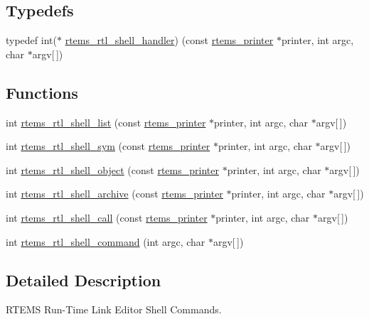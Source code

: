 \subsection*{Typedefs}
\begin{DoxyCompactItemize}
\item 
typedef int($\ast$ \mbox{\hyperlink{rtl-shell_8c_abdb8a1e1d10a86732342e0157986f7ff}{rtems\+\_\+rtl\+\_\+shell\+\_\+handler}}) (const \mbox{\hyperlink{structrtems__printer}{rtems\+\_\+printer}} $\ast$printer, int argc, char $\ast$argv\mbox{[}$\,$\mbox{]})
\end{DoxyCompactItemize}
\subsection*{Functions}
\begin{DoxyCompactItemize}
\item 
int \mbox{\hyperlink{rtl-shell_8c_a1f9b3cb0aafe4ed009d797499b64e9e4}{rtems\+\_\+rtl\+\_\+shell\+\_\+list}} (const \mbox{\hyperlink{structrtems__printer}{rtems\+\_\+printer}} $\ast$printer, int argc, char $\ast$argv\mbox{[}$\,$\mbox{]})
\item 
int \mbox{\hyperlink{rtl-shell_8c_a50394981270941b025148ece371a0e5d}{rtems\+\_\+rtl\+\_\+shell\+\_\+sym}} (const \mbox{\hyperlink{structrtems__printer}{rtems\+\_\+printer}} $\ast$printer, int argc, char $\ast$argv\mbox{[}$\,$\mbox{]})
\item 
int \mbox{\hyperlink{rtl-shell_8c_ab9ed5fe1cd6d728c22f423a566b3ec1e}{rtems\+\_\+rtl\+\_\+shell\+\_\+object}} (const \mbox{\hyperlink{structrtems__printer}{rtems\+\_\+printer}} $\ast$printer, int argc, char $\ast$argv\mbox{[}$\,$\mbox{]})
\item 
int \mbox{\hyperlink{rtl-shell_8c_a6d62d1191b9362ec04fc2305eea21280}{rtems\+\_\+rtl\+\_\+shell\+\_\+archive}} (const \mbox{\hyperlink{structrtems__printer}{rtems\+\_\+printer}} $\ast$printer, int argc, char $\ast$argv\mbox{[}$\,$\mbox{]})
\item 
int \mbox{\hyperlink{rtl-shell_8c_a80ea92b004f787087876764852d994fd}{rtems\+\_\+rtl\+\_\+shell\+\_\+call}} (const \mbox{\hyperlink{structrtems__printer}{rtems\+\_\+printer}} $\ast$printer, int argc, char $\ast$argv\mbox{[}$\,$\mbox{]})
\item 
int \mbox{\hyperlink{rtl-shell_8c_aa548220d324834be6c5703605f7aa127}{rtems\+\_\+rtl\+\_\+shell\+\_\+command}} (int argc, char $\ast$argv\mbox{[}$\,$\mbox{]})
\end{DoxyCompactItemize}


\subsection{Detailed Description}
R\+T\+E\+MS Run-\/\+Time Link Editor Shell Commands. 

